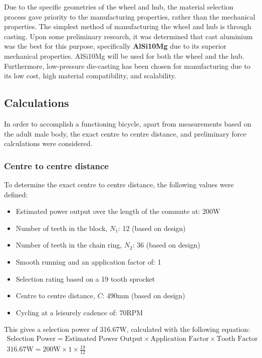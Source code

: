 \documentclass[a4paper,11pt]{article}
\begin{document}
Due to the specific geometries of the wheel and hub, the material selection process gave priority to the manufacturing properties, rather than the mechanical properties. The simplest method of manufacturing the wheel and hub is through casting. Upon some preliminary research, it was determined that cast aluminium was the best for this purpose, specifically \textbf{AlSi10Mg} due to its superior mechanical properties. AlSi10Mg will be used for both the wheel and the hub. Furthermore, low-pressure die-casting has been chosen for manufacturing due to its low cost, high material compatibility, and scalability. 

\subsection{Calculations}
\label{sec:calculations}

In order to accomplish a functioning bicycle, apart from measurements based on the adult male body, the exact centre to centre distance, and preliminary force calculations were considered.

\subsubsection{Centre to centre distance}

To determine the exact centre to centre distance, the following values were defined:

\begin{itemize}
	\setlength{\itemsep}{0pt}
	\item Estimated power output over the length of the commute at: 200W \cite{wilson04} 
	\item Number of teeth in the block, $N_{1}$: 12 (based on design) 
	\item Number of teeth in the chain ring, $N_{2}$: 36 (based on design) 
	\item Smooth running and an application factor of: 1 \hfill\cite{childs04}
	\item Selection rating based on a 19 tooth sprocket \hfill\cite{childs04}
	\item Centre to centre distance, $C$: 490mm (based on design) 
	\item Cycling at a leisurely cadence of: 70RPM \hfill\cite{lucia01}
\end{itemize}

This gives a selection power of 316.67W, calculated with the following equation:
\begin{gather*}
	\text{Selection Power}=\text{Estimated Power Output}\times\text{Application Factor}\times\text{Tooth Factor}\\
	316.67\text{W}=200\text{W}\times 1\times \frac{19}{12}
\end{gather*}
\end{document}
